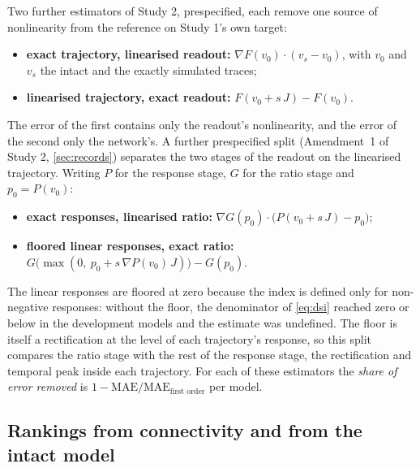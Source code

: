 Two further estimators of Study 2, prespecified, each remove one source of nonlinearity from the reference on Study 1's own target:
\begin{itemize}
  \item \textbf{exact trajectory, linearised readout:} $\nabla F(v_0)\cdot(v_s-v_0)$, with $v_0$ and $v_s$ the intact and the exactly simulated traces;
  \item \textbf{linearised trajectory, exact readout:} $F(v_0+s\,J)-F(v_0)$.
\end{itemize}
The error of the first contains only the readout's nonlinearity, and the error of the second only the network's. A further prespecified split (Amendment~1 of Study 2, \cref{sec:records}) separates the two stages of the readout on the linearised trajectory. Writing $P$ for the response stage, $G$ for the ratio stage and $p_0=P(v_0)$:
\begin{itemize}
  \item \textbf{exact responses, linearised ratio:} $\nabla G(p_0)\cdot\big(P(v_0+s\,J)-p_0\big)$;
  \item \textbf{floored linear responses, exact ratio:} $G\big(\max(0,\ p_0+s\,\nabla P(v_0)\,J)\big)-G(p_0)$.
\end{itemize}
The linear responses are floored at zero because the index is defined only for non-negative responses: without the floor, the denominator of \cref{eq:dsi} reached zero or below in the development models and the estimate was undefined. The floor is itself a rectification at the level of each trajectory's response, so this split compares the ratio stage with the rest of the response stage, the rectification and temporal peak inside each trajectory. For each of these estimators the \emph{share of error removed} is $1-\text{MAE}/\text{MAE}_{\text{first order}}$ per model.

\subsection{Rankings from connectivity and from the intact model}
\label{sec:comparators}


